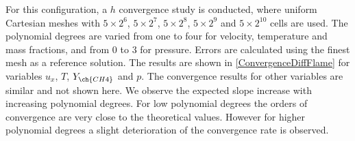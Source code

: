 For this configuration, a $h$ convergence study is conducted, where uniform Cartesian meshes with $5\times2^6$, $5\times2^7$, $5\times2^8$,  $5\times2^9$ and $5\times2^{10}$  cells are used. The polynomial degrees are varied from one to four for velocity, temperature and mass fractions, and from 0 to 3 for pressure.  Errors are calculated using the finest mesh as a reference solution.  The results are shown in \cref{ConvergenceDiffFlame} for variables $u_x$, $T$, $Y_{\ch{CH4}}$ and $p$. The convergence results for other variables are similar and not shown here. We observe the expected slope increase with increasing polynomial degrees. For low polynomial degrees the orders of convergence are very close to the theoretical values. However for higher polynomial degrees  a slight deterioration of the convergence rate is observed.